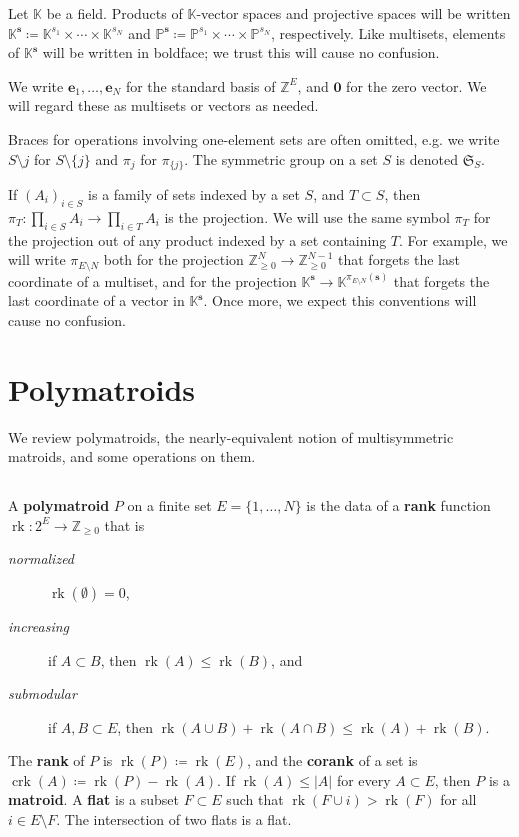 \documentclass[11pt]{article}
\theoremstyle{definition}
\numberwithin{equation}{section}
\renewcommand{\P}{\mathbb{P}}
\newcommand{\Z}{{\mathbb{Z}}}
\newcommand{\N}{\mathbb{Z}_{\geq 0}}
\newcommand{\K}{\mathbb{K}}
\DeclareMathOperator{\rk}{rk}
\DeclareMathOperator{\crk}{crk}
\newcommand{\word}[1]{\textbf{#1}}
\begin{document}
Let $\K$ be a field. Products of $\K$-vector spaces and projective spaces will be written $\K^{\mathbf s} \coloneqq  \K^{s_1} \times \cdots \times \K^{s_N}$ and $\P^{\mathbf s} \coloneqq  \P^{s_1} \times \cdots \times \P^{s_N}$, respectively.
Like multisets, elements of $\K^{\mathbf s}$ will be written in boldface; we trust this will cause no confusion.

We write $\mathbf e_1, \ldots, \mathbf e_N$ for the standard basis of $\Z^E$,  and $\mathbf 0$ for the zero vector.
We will regard these as multisets or vectors as needed.

Braces for operations involving one-element sets are often omitted, e.g. we write $S \setminus j$ for $S \setminus \{j\}$ and $\pi_j$ for $\pi_{\{j\}}$.
The symmetric group on a set $S$ is denoted $\mathfrak S_S$.

If $(A_i)_{i \in S}$ is a family of sets indexed by a set $S$, and $T \subset S$, then $\pi_T: \prod_{i \in S} A_i \to \prod_{i \in T}A_i$ is the projection.
We will use the same symbol $\pi_T$ for the projection out of any product indexed by a set containing $T$.
For example, we will write $\pi_{E \setminus N}$ both for the projection $\N^N \to \N^{N-1}$ that forgets the last coordinate of a multiset, and for the projection $\K^{\mathbf s} \to \K^{\pi_{E \setminus N}(\mathbf s)}$ that forgets the last coordinate of a vector in $\K^{\mathbf s}$. Once more, we expect this conventions will cause no confusion.

\section{Polymatroids}\label{sec_poly}
We review polymatroids, the nearly-equivalent notion of multisymmetric matroids, and some operations on them.

\subsection{}



\noindent A \word{polymatroid} $P$ on a finite set $E = \{1, \ldots, N\}$ is the data of a \word{rank} function $\rk: 2^E \to \Z_{\geq 0}$ that is
\begin{description}
\item[\textit{normalized}] $\rk(\emptyset) = 0$,
\item[\textit{increasing}] if $A \subset B$, then $\rk(A) \leq \rk(B)$, and
\item[\textit{submodular}] if $A, B \subset E$, then $\rk(A \cup B) + \rk(A \cap B) \leq \rk(A) + \rk(B)$.
\end{description}
The \word{rank} of $P$ is $\rk(P) \coloneqq  \rk(E)$, and 
the \word{corank} of a set is $\crk(A) \coloneqq  \rk(P) - \rk(A)$.
If $\rk(A) \leq |A|$ for every $A \subset E$, then $P$ is a \word{matroid}.
A \word{flat} is a subset $F \subset E$ such that $\rk(F \cup i) > \rk(F)$ for all $i \in E \setminus F$.
The intersection of two flats is a flat.
\end{document}
